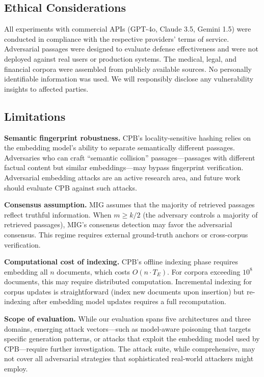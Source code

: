 \documentclass[journal,10pt]{IEEEtran}
\begin{document}
\subsection{Ethical Considerations}
All experiments with commercial APIs (GPT-4o, Claude 3.5, Gemini 1.5) were conducted in compliance with the respective providers' terms of service. Adversarial passages were designed to evaluate defense effectiveness and were not deployed against real users or production systems. The medical, legal, and financial corpora were assembled from publicly available sources. No personally identifiable information was used. We will responsibly disclose any vulnerability insights to affected parties.

\subsection{Limitations}
\textbf{Semantic fingerprint robustness.} CPB's locality-sensitive hashing relies on the embedding model's ability to separate semantically different passages. Adversaries who can craft ``semantic collision'' passages---passages with different factual content but similar embeddings---may bypass fingerprint verification. Adversarial embedding attacks are an active research area, and future work should evaluate CPB against such attacks.

\textbf{Consensus assumption.} MIG assumes that the majority of retrieved passages reflect truthful information. When $m \geq k/2$ (the adversary controls a majority of retrieved passages), MIG's consensus detection may favor the adversarial consensus. This regime requires external ground-truth anchors or cross-corpus verification.

\textbf{Computational cost of indexing.} CPB's offline indexing phase requires embedding all $n$ documents, which costs $O(n \cdot T_E)$. For corpora exceeding $10^8$ documents, this may require distributed computation. Incremental indexing for corpus updates is straightforward (index new documents upon insertion) but re-indexing after embedding model updates requires a full recomputation.

\textbf{Scope of evaluation.} While our evaluation spans five architectures and three domains, emerging attack vectors---such as model-aware poisoning that targets specific generation patterns, or attacks that exploit the embedding model used by CPB---require further investigation. The attack suite, while comprehensive, may not cover all adversarial strategies that sophisticated real-world attackers might employ.
\end{document}
